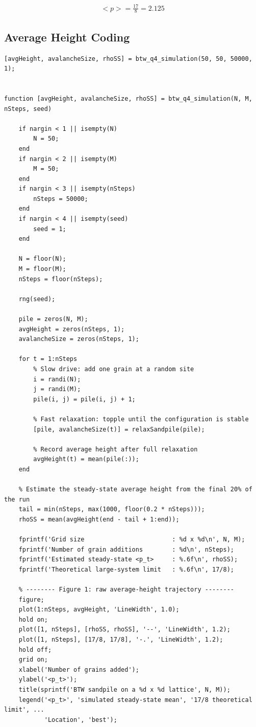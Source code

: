 \documentclass{article}
\begin{document}
\begin{align}
    <p> =\frac{17}{8} = 2.125
\end{align}

\clearpage

\subsection{Average Height Coding}
\begin{lstlisting}
[avgHeight, avalancheSize, rhoSS] = btw_q4_simulation(50, 50, 50000, 1);


function [avgHeight, avalancheSize, rhoSS] = btw_q4_simulation(N, M, nSteps, seed)

    if nargin < 1 || isempty(N)
        N = 50;
    end
    if nargin < 2 || isempty(M)
        M = 50;
    end
    if nargin < 3 || isempty(nSteps)
        nSteps = 50000;
    end
    if nargin < 4 || isempty(seed)
        seed = 1;
    end

    N = floor(N);
    M = floor(M);
    nSteps = floor(nSteps);

    rng(seed);

    pile = zeros(N, M);
    avgHeight = zeros(nSteps, 1);
    avalancheSize = zeros(nSteps, 1);

    for t = 1:nSteps
        % Slow drive: add one grain at a random site
        i = randi(N);
        j = randi(M);
        pile(i, j) = pile(i, j) + 1;

        % Fast relaxation: topple until the configuration is stable
        [pile, avalancheSize(t)] = relaxSandpile(pile);

        % Record average height after full relaxation
        avgHeight(t) = mean(pile(:));
    end

    % Estimate the steady-state average height from the final 20% of the run
    tail = min(nSteps, max(1000, floor(0.2 * nSteps)));
    rhoSS = mean(avgHeight(end - tail + 1:end));

    fprintf('Grid size                        : %d x %d\n', N, M);
    fprintf('Number of grain additions        : %d\n', nSteps);
    fprintf('Estimated steady-state <p_t>     : %.6f\n', rhoSS);
    fprintf('Theoretical large-system limit   : %.6f\n', 17/8);

    % -------- Figure 1: raw average-height trajectory --------
    figure;
    plot(1:nSteps, avgHeight, 'LineWidth', 1.0);
    hold on;
    plot([1, nSteps], [rhoSS, rhoSS], '--', 'LineWidth', 1.2);
    plot([1, nSteps], [17/8, 17/8], '-.', 'LineWidth', 1.2);
    hold off;
    grid on;
    xlabel('Number of grains added');
    ylabel('<p_t>');
    title(sprintf('BTW sandpile on a %d x %d lattice', N, M));
    legend('<p_t>', 'simulated steady-state mean', '17/8 theoretical limit', ...
           'Location', 'best');


\end{lstlisting}
\end{document}
